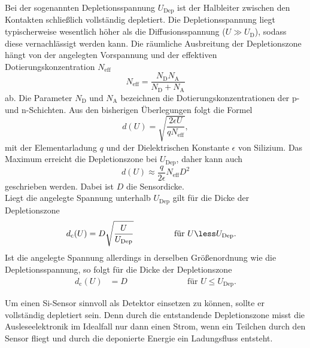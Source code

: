 Bei der sogenannten Depletionsspannung $U_\text{Dep}$ ist der Halbleiter zwischen den Kontakten schließlich vollständig depletiert.
Die Depletionsspannung liegt typischerweise wesentlich höher als die
Diffusionsspannung ($U \gg U_\text{D}$), sodass diese vernachlässigt werden kann. Die räumliche Ausbreitung der Depletionszone hängt von der angelegten Vorspannung und der effektiven Dotierungskonzentration
$N_\text{eff}$
\begin{equation}
  N_\text{eff} = \frac{N_\text{D}N_\text{A}}{N_\text{D}+N_\text{A}}
\end{equation}
ab.
Die Parameter $N_\text{D}$ und $N_\text{A}$ bezeichnen die Dotierungskonzentrationen der p- und n-Schichten. Aus den bisherigen Überlegungen folgt die Formel
\begin{equation}
  d(U) = \sqrt{\frac{2\epsilon U}{q N_\text{eff}}},
\end{equation}
mit der Elementarladung $q$ und der Dielektrischen Konstante $\epsilon$ von Silizium. Das Maximum erreicht die Depletionszone bei $U_\text{Dep}$, daher kann auch
\begin{equation}
  d(U) \approx \frac{q}{2\epsilon} N_\text{eff}D^2
\end{equation}
geschrieben werden. Dabei ist $D$ die Sensordicke.\\
Liegt die angelegte Spannung unterhalb $U_\text{Dep}$ gilt für die Dicke der Depletionszone
\begin{align}
  d_\text{c}(U) &= D\sqrt{\frac{U}{U_\text{Dep}}} \hspace{1.7cm}\text{für } U \less U_\text{Dep}.
  \label{eqn:dicke-depletionszone}
\end{align}
Ist die angelegte Spannung allerdings in derselben Größenordnung wie die Depletionsspannung, so folgt für die Dicke der Depletionszone
 \begin{align*}
   d_\text{c}(U) &= D \hspace{3cm}\text{für } U \le U_\text{Dep}.
 \end{align*}

Um einen Si-Sensor sinnvoll als Detektor einsetzen zu können, sollte er vollständig depletiert sein. Denn durch die entstandende Depletionszone misst die Ausleseelektronik im Idealfall nur dann einen Strom, wenn ein Teilchen durch den Sensor fliegt und durch die deponierte Energie ein Ladungsfluss entsteht.


